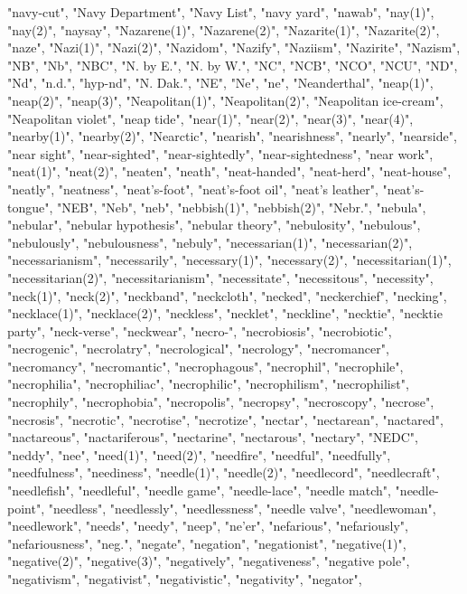 "navy-cut",
"Navy Department",
"Navy List",
"navy yard",
"nawab",
"nay(1)",
"nay(2)",
"naysay",
"Nazarene(1)",
"Nazarene(2)",
"Nazarite(1)",
"Nazarite(2)",
"naze",
"Nazi(1)",
"Nazi(2)",
"Nazidom",
"Nazify",
"Naziism",
"Nazirite",
"Nazism",
"NB",
"Nb",
"NBC",
"N. by E.",
"N. by W.",
"NC",
"NCB",
"NCO",
"NCU",
"ND",
"Nd",
"n.d.",
"hyp-nd",
"N. Dak.",
"NE",
"Ne",
"ne",
"Neanderthal",
"neap(1)",
"neap(2)",
"neap(3)",
"Neapolitan(1)",
"Neapolitan(2)",
"Neapolitan ice-cream",
"Neapolitan violet",
"neap tide",
"near(1)",
"near(2)",
"near(3)",
"near(4)",
"nearby(1)",
"nearby(2)",
"Nearctic",
"nearish",
"nearishness",
"nearly",
"nearside",
"near sight",
"near-sighted",
"near-sightedly",
"near-sightedness",
"near work",
"neat(1)",
"neat(2)",
"neaten",
"neath",
"neat-handed",
"neat-herd",
"neat-house",
"neatly",
"neatness",
"neat's-foot",
"neat's-foot oil",
"neat's leather",
"neat's-tongue",
"NEB",
"Neb",
"neb",
"nebbish(1)",
"nebbish(2)",
"Nebr.",
"nebula",
"nebular",
"nebular hypothesis",
"nebular theory",
"nebulosity",
"nebulous",
"nebulously",
"nebulousness",
"nebuly",
"necessarian(1)",
"necessarian(2)",
"necessarianism",
"necessarily",
"necessary(1)",
"necessary(2)",
"necessitarian(1)",
"necessitarian(2)",
"necessitarianism",
"necessitate",
"necessitous",
"necessity",
"neck(1)",
"neck(2)",
"neckband",
"neckcloth",
"necked",
"neckerchief",
"necking",
"necklace(1)",
"necklace(2)",
"neckless",
"necklet",
"neckline",
"necktie",
"necktie party",
"neck-verse",
"neckwear",
"necro-",
"necrobiosis",
"necrobiotic",
"necrogenic",
"necrolatry",
"necrological",
"necrology",
"necromancer",
"necromancy",
"necromantic",
"necrophagous",
"necrophil",
"necrophile",
"necrophilia",
"necrophiliac",
"necrophilic",
"necrophilism",
"necrophilist",
"necrophily",
"necrophobia",
"necropolis",
"necropsy",
"necroscopy",
"necrose",
"necrosis",
"necrotic",
"necrotise",
"necrotize",
"nectar",
"nectarean",
"nactared",
"nactareous",
"nactariferous",
"nectarine",
"nectarous",
"nectary",
"NEDC",
"neddy",
"nee",
"need(1)",
"need(2)",
"needfire",
"needful",
"needfully",
"needfulness",
"neediness",
"needle(1)",
"needle(2)",
"needlecord",
"needlecraft",
"needlefish",
"needleful",
"needle game",
"needle-lace",
"needle match",
"needle-point",
"needless",
"needlessly",
"needlessness",
"needle valve",
"needlewoman",
"needlework",
"needs",
"needy",
"neep",
"ne'er",
"nefarious",
"nefariously",
"nefariousness",
"neg.",
"negate",
"negation",
"negationist",
"negative(1)",
"negative(2)",
"negative(3)",
"negatively",
"negativeness",
"negative pole",
"negativism",
"negativist",
"negativistic",
"negativity",
"negator",
